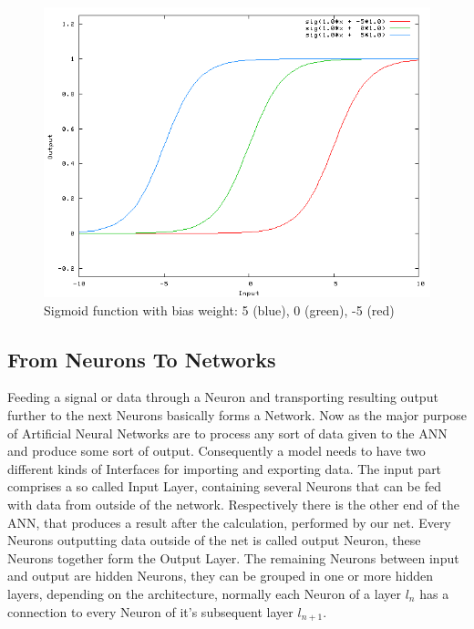 \begin{figure}[H]
	\centering
	\includegraphics[width=\textwidth]{images/sigmoid.png}
	\caption{Sigmoid function with bias weight: 5 (blue), 0 (green), -5 (red){\cite{sigmoid}}}
	\label{fig:sigmoid}
	
\end{figure}


\subsection{From Neurons To Networks}
Feeding a signal or data through a Neuron and transporting resulting output further to the next Neurons basically forms a Network. Now as the major purpose of Artificial Neural Networks are to process any sort of data given to the ANN and produce some sort of output. Consequently a model needs to have two different kinds of Interfaces for importing and exporting data. \newline
The input part comprises a so called Input Layer, containing several Neurons that can be fed with data from outside of the network. Respectively there is the other end of the ANN, that produces a result after the calculation, performed by our net. Every Neurons outputting data outside of the net is called output Neuron, these Neurons together form the Output Layer. The remaining Neurons between input and output are hidden Neurons, they can be grouped in one or more hidden layers, depending on the architecture, normally each Neuron of a layer $l_{n}$ has a connection to every Neuron of it's subsequent layer $l_{n+1}$.

